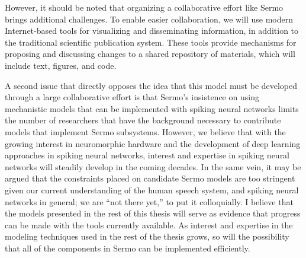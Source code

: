 However, it should be noted that
organizing a collaborative effort
like Sermo brings additional challenges.
To enable easier collaboration,
we will use modern Internet-based tools
for visualizing
and disseminating information,
in addition to the traditional
scientific publication system.
These tools provide mechanisms
for proposing and discussing changes
to a shared repository of materials,
which will include text, figures, and code.

A second issue that directly opposes
the idea that this model must be
developed through a large collaborative effort
is that Sermo's insistence on
using mechanistic models that
can be implemented with spiking neural networks
limits the number of researchers
that have the background necessary
to contribute models that implement
Sermo subsystems.
However, we believe that with the growing
interest in neuromorphic hardware
and the development of deep learning approaches
in spiking neural networks,
interest and expertise in spiking neural networks
will steadily develop in the coming decades.
In the same vein, it may be argued that
the constraints placed on candidate Sermo models
are too stringent given our current understanding
of the human speech system,
and spiking neural networks in general;
we are ``not there yet,'' to put it colloquially.
I believe that the models presented
in the rest of this thesis
will serve as evidence that
progress can be made with
the tools currently available.
As interest and expertise in
the modeling techniques used
in the rest of the thesis grows,
so will the possibility
that all of the components in Sermo
can be implemented efficiently.
